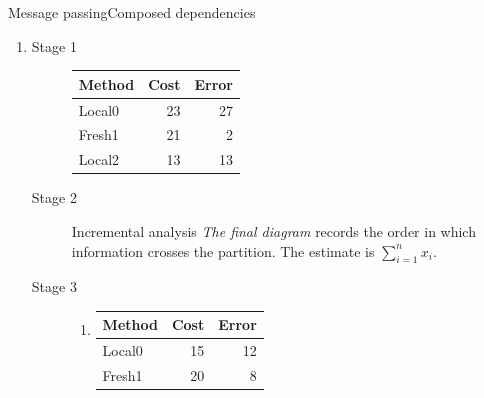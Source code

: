 \documentclass[9pt,aspectratio=43]{beamer}
\begin{document}
\begin{frame}[t,shrink=5]{Message passing}{Composed dependencies}
\begin{enumerate}
\begin{columns}[onlytextwidth,t]
\begin{column}{0.62\textwidth}
\begin{center}
\end{center}
\end{column}
\begin{column}{0.34\textwidth}
\begin{block}{Constraint propagation}
\textrm{The next pass} must preserve the boundary conditions while revisiting dependent values. The next pass must preserve the boundary conditions while revisiting dependent values. The estimate is $\sum_{i=1}^{n}x_i$.
\end{block}
\end{column}
\end{columns}
\item \begin{description}
\item[Stage 1] \begin{tabular}{lrr}Method&Cost&Error\\\hline
Local0&23&27\\
Fresh1&21&2\\
Local2&13&13\\
\end{tabular}
\item[Stage 2] \begin{alertblock}{Incremental analysis}
\textit{The final diagram} records the order in which information crosses the partition.  The estimate is $\sum_{i=1}^{n}x_i$.
\end{alertblock}
\item[Stage 3] \begin{enumerate}
\item \begin{tabular}{lrr}Method&Cost&Error\\\hline
Local0&15&12\\
Fresh1&20&8\\

\end{tabular}
\end{enumerate}
\end{description}
\end{enumerate}
\end{frame}
\end{document}
